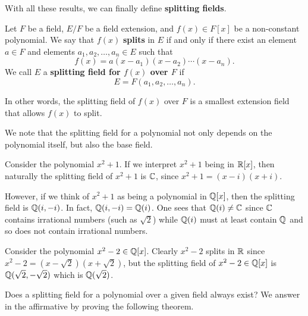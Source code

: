 With all these results, we can finally define \textbf{splitting fields}.

\begin{definition}
    Let $F$ be a field, $E/F$ be a field extension, and $f(x) \in F[x]$ be a non-constant polynomial. We say that $f(x)$ \textbf{splits} in $E$ if and only if there exist an element $a \in F$ and elements $a_1, a_2, \dots, a_n \in E$ such that
    \[
        f(x) = a(x-a_1)(x-a_2)\cdots(x-a_n).
    \]
    We call $E$ a \textbf{splitting field for $f(x)$ over $F$} if
    \[
        E = F(a_1, a_2, \dots, a_n).
    \]
\end{definition}
\begin{remark}
    In other words, the splitting field of $f(x)$ over $F$ is a smallest extension field that allows $f(x)$ to split.
\end{remark}

We note that the splitting field for a polynomial not only depends on the polynomial itself, but also the base field.

\begin{example}
    Consider the polynomial $x^2 + 1$. If we interpret $x^2 + 1$ being in $\mathbb{R}[x]$, then naturally the splitting field of $x^2 + 1$ is $\mathbb{C}$, since $x^2 + 1 = (x-i)(x+i)$.

    However, if we think of $x^2+1$ as being a polynomial in $\mathbb{Q}[x]$, then the splitting field is $\mathbb{Q}(i, -i)$. In fact, $\mathbb{Q}(i, -i) = \mathbb{Q}(i)$. One sees that $\mathbb{Q}(i) \neq \mathbb{C}$ since $\mathbb{C}$ contains irrational numbers (such as $\sqrt2$) while $\mathbb{Q}(i)$ must at least contain $\mathbb{Q}$ and so does not contain irrational numbers.
\end{example}

\begin{example}
    Consider the polynomial $x^2 - 2 \in \mathbb{Q}[x]$. Clearly $x^2 - 2$ splits in $\mathbb{R}$ since $x^2 - 2 = (x - \sqrt2)(x + \sqrt2)$, but the splitting field of $x^2 - 2 \in \mathbb{Q}[x]$ is $\mathbb{Q}(\sqrt2, -\sqrt2)$ which is $\mathbb{Q}(\sqrt 2)$.
\end{example}

Does a splitting field for a polynomial over a given field always exist? We answer in the affirmative by proving the following theorem.


